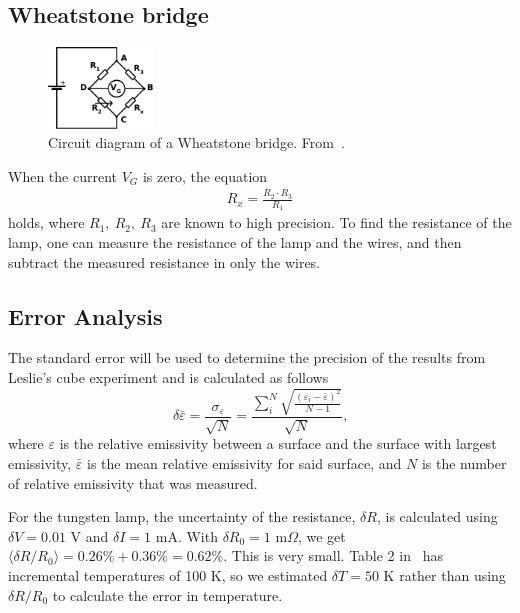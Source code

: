 \documentclass[5p,sort&compress]{elsarticle}
\begin{document}
\subsection{Wheatstone bridge}
\begin{figure}[t]
    \centering
    \includegraphics[width=0.25\textwidth]{../wheatstone_bridge.pdf}
    \caption{Circuit diagram of a Wheatstone bridge. From~\cite{wheatstone_fig}.}
    \label{fig:wheatstone}
\end{figure}
When the current $V_G$ is zero, the equation 
\begin{align}
    R_x = \frac{R_2 \cdot R_3}{R_1}
\end{align}
holds, where $R_1,\ R_2,\ R_3$ are known to high precision. To find the resistance of the lamp, one can measure the resistance of the lamp and the wires, and then subtract the measured resistance in only the wires.

\subsection{Error Analysis}
The standard error will be used to determine the precision of the results from Leslie's cube experiment and is calculated as follows
\begin{equation}
    \delta \bar \varepsilon 
    = \frac{\sigma_{\varepsilon}}{\sqrt{N}} 
    = \frac{\sum^N_i\sqrt{  \frac{(\varepsilon_i-\bar\varepsilon)^2}{N-1}}}{\sqrt N} \text{,}
\end{equation}
where $\varepsilon$ is the relative emissivity between a surface and the surface with largest emissivity, $\bar \varepsilon$ is the mean relative emissivity for said surface, and $N$ is the number of relative emissivity that was measured.  

For the tungsten lamp, the uncertainty of the resistance, $\delta R$, is calculated using $\delta V = 0.01$ V and $\delta I = 1$ mA. With $\delta R_0 = 1$ m$\Omega$, we get $\langle\delta R / R_0 \rangle = 0.26\% + 0.36\% = 0.62\%$. This is very small. Table 2 in~\cite{pasco} has incremental temperatures of 100 K, so we estimated $\delta T = 50$ K rather than using $\delta R / R_0$ to calculate the error in temperature.
\end{document}

